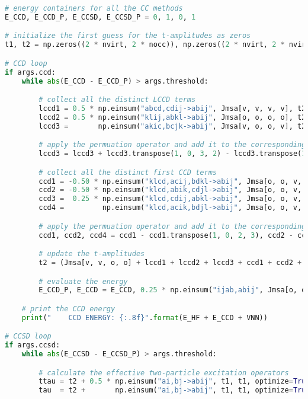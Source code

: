 \raggedbottom\begin{lstlisting}[language=Python, caption={\acrshort{ccd} and \acrshort{ccsd} method exercise code solution.}, label=code:cc_solution]
# energy containers for all the CC methods
E_CCD, E_CCD_P, E_CCSD, E_CCSD_P = 0, 1, 0, 1

# initialize the first guess for the t-amplitudes as zeros
t1, t2 = np.zeros((2 * nvirt, 2 * nocc)), np.zeros((2 * nvirt, 2 * nvirt, 2 * nocc, 2 * nocc))

# CCD loop
if args.ccd:
    while abs(E_CCD - E_CCD_P) > args.threshold:

        # collect all the distinct LCCD terms
        lccd1 = 0.5 * np.einsum("abcd,cdij->abij", Jmsa[v, v, v, v], t2, optimize=True)
        lccd2 = 0.5 * np.einsum("klij,abkl->abij", Jmsa[o, o, o, o], t2, optimize=True)
        lccd3 =       np.einsum("akic,bcjk->abij", Jmsa[v, o, o, v], t2, optimize=True)

        # apply the permuation operator and add it to the corresponding LCCD terms
        lccd3 = lccd3 + lccd3.transpose(1, 0, 3, 2) - lccd3.transpose(1, 0, 2, 3) - lccd3.transpose(0, 1, 3, 2)

        # collect all the distinct first CCD terms
        ccd1 = -0.50 * np.einsum("klcd,acij,bdkl->abij", Jmsa[o, o, v, v], t2, t2, optimize=True)
        ccd2 = -0.50 * np.einsum("klcd,abik,cdjl->abij", Jmsa[o, o, v, v], t2, t2, optimize=True)
        ccd3 =  0.25 * np.einsum("klcd,cdij,abkl->abij", Jmsa[o, o, v, v], t2, t2, optimize=True)
        ccd4 =         np.einsum("klcd,acik,bdjl->abij", Jmsa[o, o, v, v], t2, t2, optimize=True)

        # apply the permuation operator and add it to the corresponding CCD terms
        ccd1, ccd2, ccd4 = ccd1 - ccd1.transpose(1, 0, 2, 3), ccd2 - ccd2.transpose(0, 1, 3, 2), ccd4 - ccd4.transpose(0, 1, 3, 2)

        # update the t-amplitudes
        t2 = (Jmsa[v, v, o, o] + lccd1 + lccd2 + lccd3 + ccd1 + ccd2 + ccd3 + ccd4) / Emsd

        # evaluate the energy
        E_CCD_P, E_CCD = E_CCD, 0.25 * np.einsum("ijab,abij", Jmsa[o, o, v, v], t2, optimize=True)

    # print the CCD energy
    print("    CCD ENERGY: {:.8f}".format(E_HF + E_CCD + VNN))

# CCSD loop
if args.ccsd:
    while abs(E_CCSD - E_CCSD_P) > args.threshold:

        # calculate the effective two-particle excitation operators
        ttau = t2 + 0.5 * np.einsum("ai,bj->abij", t1, t1, optimize=True) - 0.5 * np.einsum("ai,bj->abij", t1, t1, optimize=True).swapaxes(2, 3)
        tau  = t2 +       np.einsum("ai,bj->abij", t1, t1, optimize=True) -       np.einsum("ai,bj->abij", t1, t1, optimize=True).swapaxes(2, 3)


\end{lstlisting}
